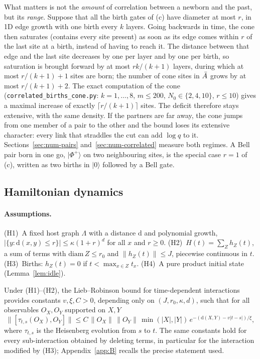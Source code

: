 \begin{remark}\label{rem:pairs}
What matters is not the \emph{amount} of correlation between a newborn and the past, but its \emph{range}. Suppose that all the birth gates of (c) have diameter at most $r$, in 1D edge growth with one birth every $k$ layers. Going backwards in time, the cone then saturates (contains every site present) as soon as its edge comes within $r$ of the last site at a birth, instead of having to reach it. The distance between that edge and the last site decreases by one per layer and by one per birth, so saturation is brought forward by at most $rk/(k+1)$ layers, during which at most $r/(k+1)+1$ sites are born; the number of cone sites in $\bar A$ grows by at most $r/(k+1)+2$. The exact computation of the cone (\texttt{correlated\_births\_cone.py}: $k=1,\dots,8$, $m\le200$, $N_0\in\{2,4,10\}$, $r\le10$) gives a maximal increase of exactly $\lceil r/(k+1)\rceil$ sites. The deficit therefore stays extensive, with the same density. If the partners are far away, the cone jumps from one member of a pair to the other and the bound loses its extensive character: every link that straddles the cut can add $\log q$ to it. Sections~\ref{sec:num-pairs} and~\ref{sec:num-correlated} measure both regimes. A Bell pair born in one go, $|\Phi^+\rangle$ on two neighbouring sites, is the special case $r=1$ of (c), written as two births in $|0\rangle$ followed by a Bell gate.
\end{remark}

\subsection{Hamiltonian dynamics}\label{sec:B}

\paragraph{Assumptions.}
(H1)~A fixed host graph $\Lambda$ with a distance $\mathrm d$ and polynomial growth, $|\{y:\mathrm d(x,y)\le r\}|\le\kappa(1+r)^d$ for all $x$ and $r\ge0$.
(H2)~$H(t)=\sum_Z h_Z(t)$, a sum of terms with $\mathrm{diam}\,Z\le r_0$ and $\|h_Z(t)\|\le J$, piecewise continuous in $t$.
(H3)~Births: $h_Z(t)=0$ if $t<\max_{x\in Z}t_x$.
(H4)~A pure product initial state (Lemma~\ref{lem:idle}).

\noindent Under (H1)--(H2), the Lieb--Robinson bound for time-dependent interactions \cite{LiebRobinson1972,NSY2019} provides constants $v,\xi,C>0$, depending only on $(J,r_0,\kappa,d)$, such that for all observables $O_X,O_Y$ supported on $X,Y$
\begin{equation}\label{eq:LR}
\big\|[\tau_{t,s}(O_X),O_Y]\big\|\le C\,\|O_X\|\,\|O_Y\|\,\min(|X|,|Y|)\,e^{-(\mathrm d(X,Y)-v|t-s|)/\xi},
\end{equation}
where $\tau_{t,s}$ is the Heisenberg evolution from $s$ to $t$. The same constants hold for every sub-interaction obtained by deleting terms, in particular for the interaction modified by (H3); Appendix~\ref{app:B} recalls the precise statement used.

